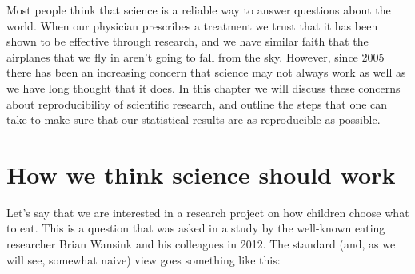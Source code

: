 \documentclass[
  12pt,
]{book}
\begin{document}
Most people think that science is a reliable way to answer questions about the world. When our physician prescribes a treatment we trust that it has been shown to be effective through research, and we have similar faith that the airplanes that we fly in aren't going to fall from the sky. However, since 2005 there has been an increasing concern that science may not always work as well as we have long thought that it does. In this chapter we will discuss these concerns about reproducibility of scientific research, and outline the steps that one can take to make sure that our statistical results are as reproducible as possible.

\hypertarget{how-we-think-science-should-work}{%
\section{How we think science should work}\label{how-we-think-science-should-work}}

Let's say that we are interested in a research project on how children choose what to eat. This is a question that was asked in a study by the well-known eating researcher Brian Wansink and his colleagues in 2012. The standard (and, as we will see, somewhat naive) view goes something like this:
\end{document}
